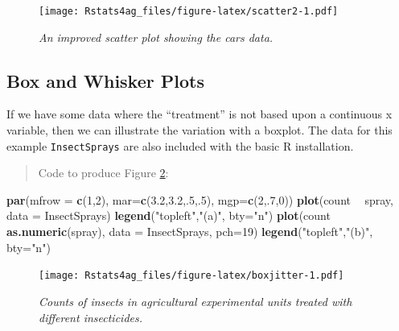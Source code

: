 \documentclass[letterpaper,]{book}
\newenvironment{Shaded}{\begin{snugshade}}{\end{snugshade}}
\newcommand{\DataTypeTok}[1]{\textcolor[rgb]{0.13,0.29,0.53}{#1}}
\newcommand{\DecValTok}[1]{\textcolor[rgb]{0.00,0.00,0.81}{#1}}
\newcommand{\FloatTok}[1]{\textcolor[rgb]{0.00,0.00,0.81}{#1}}
\newcommand{\KeywordTok}[1]{\textcolor[rgb]{0.13,0.29,0.53}{\textbf{#1}}}
\newcommand{\NormalTok}[1]{#1}
\newcommand{\OperatorTok}[1]{\textcolor[rgb]{0.81,0.36,0.00}{\textbf{#1}}}
\newcommand{\StringTok}[1]{\textcolor[rgb]{0.31,0.60,0.02}{#1}}
\begin{document}
\begin{figure}
\centering
\texttt{[image: Rstats4ag\_files/figure-latex/scatter2-1.pdf]}
\caption{\label{fig:scatter2}\emph{An improved scatter plot showing the cars data.}}
\end{figure}

\hypertarget{box-and-whisker-plots}{%
\subsection{Box and Whisker Plots}\label{box-and-whisker-plots}}

If we have some data where the ``treatment'' is not based upon a continuous x variable, then we can illustrate the variation with a boxplot. The data for this example \texttt{InsectSprays} are also included with the basic R installation.

\begin{quote}
Code to produce Figure \ref{fig:boxjitter}:
\end{quote}

\begin{Shaded}
\begin{Highlighting}[]
\KeywordTok{par}\NormalTok{(}\DataTypeTok{mfrow =} \KeywordTok{c}\NormalTok{(}\DecValTok{1}\NormalTok{,}\DecValTok{2}\NormalTok{), }\DataTypeTok{mar=}\KeywordTok{c}\NormalTok{(}\FloatTok{3.2}\NormalTok{,}\FloatTok{3.2}\NormalTok{,.}\DecValTok{5}\NormalTok{,.}\DecValTok{5}\NormalTok{), }\DataTypeTok{mgp=}\KeywordTok{c}\NormalTok{(}\DecValTok{2}\NormalTok{,.}\DecValTok{7}\NormalTok{,}\DecValTok{0}\NormalTok{))}
\KeywordTok{plot}\NormalTok{(count }\OperatorTok{~}\StringTok{ }\NormalTok{spray, }\DataTypeTok{data =}\NormalTok{ InsectSprays)}
  \KeywordTok{legend}\NormalTok{(}\StringTok{"topleft"}\NormalTok{,}\StringTok{"(a)"}\NormalTok{, }\DataTypeTok{bty=}\StringTok{"n"}\NormalTok{)}
\KeywordTok{plot}\NormalTok{(count }\OperatorTok{~}\StringTok{ }\KeywordTok{as.numeric}\NormalTok{(spray), }\DataTypeTok{data =}\NormalTok{ InsectSprays, }\DataTypeTok{pch=}\DecValTok{19}\NormalTok{)}
  \KeywordTok{legend}\NormalTok{(}\StringTok{"topleft"}\NormalTok{,}\StringTok{"(b)"}\NormalTok{, }\DataTypeTok{bty=}\StringTok{"n"}\NormalTok{)}
\end{Highlighting}
\end{Shaded}

\begin{figure}
\centering
\texttt{[image: Rstats4ag\_files/figure-latex/boxjitter-1.pdf]}
\caption{\label{fig:boxjitter}\emph{Counts of insects in agricultural experimental units treated with different insecticides.}}
\end{figure}
\end{document}

